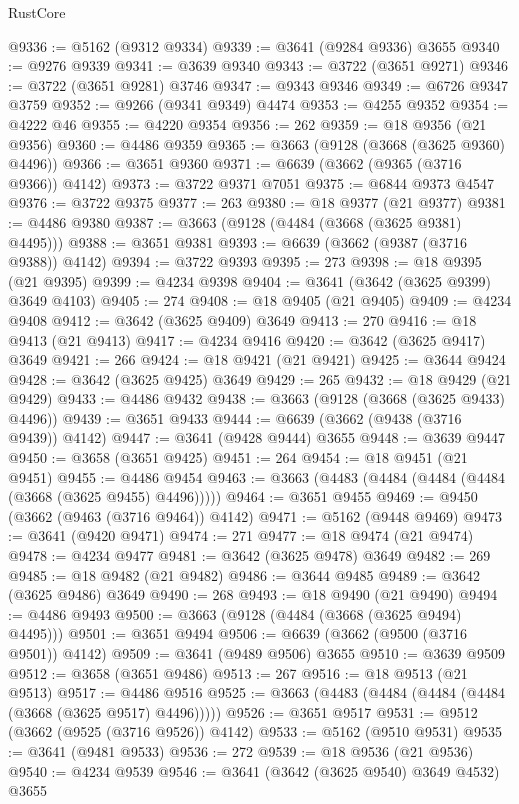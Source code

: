 \begin{lexlean}{RustCore}
\begin{coremodule}
@9336 := @5162 (@9312 @9334)
@9339 := @3641 (@9284 @9336) @3655
@9340 := @9276 @9339
@9341 := @3639 @9340
@9343 := @3722 (@3651 @9271)
@9346 := @3722 (@3651 @9281) @3746
@9347 := @9343 @9346
@9349 := @6726 @9347 @3759
@9352 := @9266 (@9341 @9349) @4474
@9353 := @4255 @9352
@9354 := @4222 @46
@9355 := @4220 @9354
@9356 := 262
@9359 := @18 @9356 (@21 @9356)
@9360 := @4486 @9359
@9365 := @3663 (@9128 (@3668 (@3625 @9360) @4496))
@9366 := @3651 @9360
@9371 := @6639 (@3662 (@9365 (@3716 @9366)) @4142)
@9373 := @3722 @9371 @7051
@9375 := @6844 @9373 @4547
@9376 := @3722 @9375
@9377 := 263
@9380 := @18 @9377 (@21 @9377)
@9381 := @4486 @9380
@9387 := @3663 (@9128 (@4484 (@3668 (@3625 @9381) @4495)))
@9388 := @3651 @9381
@9393 := @6639 (@3662 (@9387 (@3716 @9388)) @4142)
@9394 := @3722 @9393
@9395 := 273
@9398 := @18 @9395 (@21 @9395)
@9399 := @4234 @9398
@9404 := @3641 (@3642 (@3625 @9399) @3649 @4103)
@9405 := 274
@9408 := @18 @9405 (@21 @9405)
@9409 := @4234 @9408
@9412 := @3642 (@3625 @9409) @3649
@9413 := 270
@9416 := @18 @9413 (@21 @9413)
@9417 := @4234 @9416
@9420 := @3642 (@3625 @9417) @3649
@9421 := 266
@9424 := @18 @9421 (@21 @9421)
@9425 := @3644 @9424
@9428 := @3642 (@3625 @9425) @3649
@9429 := 265
@9432 := @18 @9429 (@21 @9429)
@9433 := @4486 @9432
@9438 := @3663 (@9128 (@3668 (@3625 @9433) @4496))
@9439 := @3651 @9433
@9444 := @6639 (@3662 (@9438 (@3716 @9439)) @4142)
@9447 := @3641 (@9428 @9444) @3655
@9448 := @3639 @9447
@9450 := @3658 (@3651 @9425)
@9451 := 264
@9454 := @18 @9451 (@21 @9451)
@9455 := @4486 @9454
@9463 := @3663 (@4483 (@4484 (@4484 (@4484 (@3668 (@3625 @9455) @4496)))))
@9464 := @3651 @9455
@9469 := @9450 (@3662 (@9463 (@3716 @9464)) @4142)
@9471 := @5162 (@9448 @9469)
@9473 := @3641 (@9420 @9471)
@9474 := 271
@9477 := @18 @9474 (@21 @9474)
@9478 := @4234 @9477
@9481 := @3642 (@3625 @9478) @3649
@9482 := 269
@9485 := @18 @9482 (@21 @9482)
@9486 := @3644 @9485
@9489 := @3642 (@3625 @9486) @3649
@9490 := 268
@9493 := @18 @9490 (@21 @9490)
@9494 := @4486 @9493
@9500 := @3663 (@9128 (@4484 (@3668 (@3625 @9494) @4495)))
@9501 := @3651 @9494
@9506 := @6639 (@3662 (@9500 (@3716 @9501)) @4142)
@9509 := @3641 (@9489 @9506) @3655
@9510 := @3639 @9509
@9512 := @3658 (@3651 @9486)
@9513 := 267
@9516 := @18 @9513 (@21 @9513)
@9517 := @4486 @9516
@9525 := @3663 (@4483 (@4484 (@4484 (@4484 (@3668 (@3625 @9517) @4496)))))
@9526 := @3651 @9517
@9531 := @9512 (@3662 (@9525 (@3716 @9526)) @4142)
@9533 := @5162 (@9510 @9531)
@9535 := @3641 (@9481 @9533)
@9536 := 272
@9539 := @18 @9536 (@21 @9536)
@9540 := @4234 @9539
@9546 := @3641 (@3642 (@3625 @9540) @3649 @4532) @3655

\end{coremodule}
\end{lexlean}
